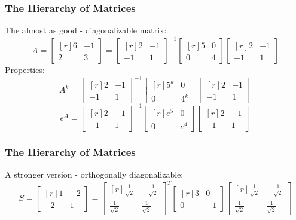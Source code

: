 \documentclass[10pt]{beamer}
\begin{document}
\begin{frame}
\frametitle{The Hierarchy of Matrices}
The almost as good - diagonalizable matrix: 
\[
A = \begin{bmatrix*}[r]
6&-1\\
2&3
\end{bmatrix*} =  \begin{bmatrix*}[r]
2&-1\\
-1&1
\end{bmatrix*}^{-1} \begin{bmatrix*}[r]
5&0\\
0&4
\end{bmatrix*}\begin{bmatrix*}[r]
2&-1\\
-1&1
\end{bmatrix*}
\]
\pause
Properties:
\[
A^k =  \begin{bmatrix*}[r]
2&-1\\
-1&1
\end{bmatrix*}^{-1} \begin{bmatrix*}[r]
5^k&0\\
0&4^k
\end{bmatrix*}\begin{bmatrix*}[r]
2&-1\\
-1&1
\end{bmatrix*}
\]
\pause
\[
e^A =   \begin{bmatrix*}[r]
2&-1\\
-1&1
\end{bmatrix*}^{-1} \begin{bmatrix*}[r]
e^5&0\\
0&e^4
\end{bmatrix*}\begin{bmatrix*}[r]
2&-1\\
-1&1
\end{bmatrix*}
\]
\end{frame}

\begin{frame}
\frametitle{The Hierarchy of Matrices}
A stronger version - orthogonally diagonalizable:
\[
S = \begin{bmatrix*}[r]
1&-2\\[1em]
-2&1
\end{bmatrix*} = \begin{bmatrix*}[r]
\frac{1}{\sqrt 2}&-\frac{1}{\sqrt 2}\\[1em]
\frac{1}{\sqrt 2}&\frac{1}{\sqrt 2}
\end{bmatrix*}^T\begin{bmatrix*}[r]
3&0\\[1em]
0&-1
\end{bmatrix*}\begin{bmatrix*}[r]
\frac{1}{\sqrt 2}&-\frac{1}{\sqrt 2}\\[1em]
\frac{1}{\sqrt 2}&\frac{1}{\sqrt 2}
\end{bmatrix*}
\]
\end{frame}
\end{document}

